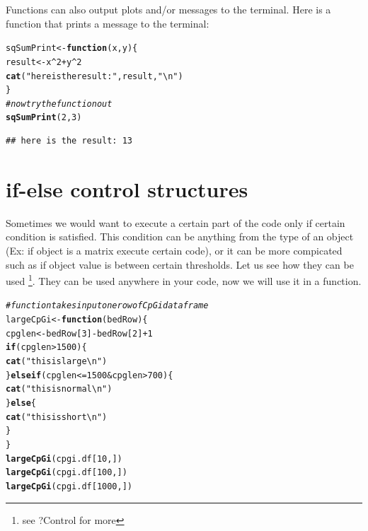 \documentclass[english,nohyper]{tufte-book}\usepackage[]{graphicx}\usepackage[]{color}
\makeatletter
\newcommand{\hlnum}[1]{\textcolor[rgb]{0.686,0.059,0.569}{#1}}%
\newcommand{\hlstr}[1]{\textcolor[rgb]{0.192,0.494,0.8}{#1}}%
\newcommand{\hlcom}[1]{\textcolor[rgb]{0.678,0.584,0.686}{\textit{#1}}}%
\newcommand{\hlopt}[1]{\textcolor[rgb]{0,0,0}{#1}}%
\newcommand{\hlstd}[1]{\textcolor[rgb]{0.345,0.345,0.345}{#1}}%
\newcommand{\hlkwa}[1]{\textcolor[rgb]{0.161,0.373,0.58}{\textbf{#1}}}%
\newcommand{\hlkwb}[1]{\textcolor[rgb]{0.69,0.353,0.396}{#1}}%
\newcommand{\hlkwc}[1]{\textcolor[rgb]{0.333,0.667,0.333}{#1}}%
\newcommand{\hlkwd}[1]{\textcolor[rgb]{0.737,0.353,0.396}{\textbf{#1}}}%
\newenvironment{kframe}{%
 \def\at@end@of@kframe{}%
 \ifinner\ifhmode%
  \def\at@end@of@kframe{\end{minipage}}%
  \begin{minipage}{\columnwidth}%
 \fi\fi%
 \def\FrameCommand##1{\hskip\@totalleftmargin \hskip-\fboxsep
 \colorbox{shadecolor}{##1}\hskip-\fboxsep
     \hskip-\linewidth \hskip-\@totalleftmargin \hskip\columnwidth}%
 \MakeFramed {\advance\hsize-\width
   \@totalleftmargin\z@ \linewidth\hsize
   \@setminipage}}%
 {\par\unskip\endMakeFramed%
 \at@end@of@kframe}
\newenvironment{knitrout}{}{} %
\makeatother
\begin{document}
Functions can also output plots and/or messages to the terminal. Here
is a function that prints a message to the terminal:

\begin{knitrout}
\color{fgcolor}\begin{kframe}
\begin{alltt}
\hlstd{sqSumPrint} \hlkwb{<-} \hlkwa{function}\hlstd{(}\hlkwc{x}\hlstd{,} \hlkwc{y}\hlstd{) \{}
    \hlstd{result} \hlkwb{<-} \hlstd{x}\hlopt{^}\hlnum{2} \hlopt{+} \hlstd{y}\hlopt{^}\hlnum{2}
    \hlkwd{cat}\hlstd{(}\hlstr{"here is the result:"}\hlstd{, result,} \hlstr{"\textbackslash{}n"}\hlstd{)}
\hlstd{\}}
\hlcom{# now try the function out}
\hlkwd{sqSumPrint}\hlstd{(}\hlnum{2}\hlstd{,} \hlnum{3}\hlstd{)}
\end{alltt}
\begin{verbatim}
## here is the result: 13
\end{verbatim}
\end{kframe}
\end{knitrout}



\section{if-else control structures}

Sometimes we would want to execute a certain part of the code only
if certain condition is satisfied. This condition can be anything
from the type of an object (Ex: if object is a matrix execute certain
code), or it can be more compicated such as if object value is between
certain thresholds. Let us see how they can be used%
\footnote{see ?Control for more%
}. They can be used anywhere in your code, now we will use it in a
function.

\begin{knitrout}
\color{fgcolor}\begin{kframe}
\begin{alltt}
\hlcom{# function takes input one row of CpGi data frame}
\hlstd{largeCpGi} \hlkwb{<-} \hlkwa{function}\hlstd{(}\hlkwc{bedRow}\hlstd{) \{}
    \hlstd{cpglen} \hlkwb{<-} \hlstd{bedRow[}\hlnum{3}\hlstd{]} \hlopt{-} \hlstd{bedRow[}\hlnum{2}\hlstd{]} \hlopt{+} \hlnum{1}
    \hlkwa{if} \hlstd{(cpglen} \hlopt{>} \hlnum{1500}\hlstd{) \{}
        \hlkwd{cat}\hlstd{(}\hlstr{"this is large\textbackslash{}n"}\hlstd{)}
    \hlstd{\}} \hlkwa{else if} \hlstd{(cpglen} \hlopt{<=} \hlnum{1500} \hlopt{&} \hlstd{cpglen} \hlopt{>} \hlnum{700}\hlstd{) \{}
        \hlkwd{cat}\hlstd{(}\hlstr{"this is normal\textbackslash{}n"}\hlstd{)}
    \hlstd{\}} \hlkwa{else} \hlstd{\{}
        \hlkwd{cat}\hlstd{(}\hlstr{"this is short\textbackslash{}n"}\hlstd{)}
    \hlstd{\}}
\hlstd{\}}
\hlkwd{largeCpGi}\hlstd{(cpgi.df[}\hlnum{10}\hlstd{, ])}
\hlkwd{largeCpGi}\hlstd{(cpgi.df[}\hlnum{100}\hlstd{, ])}
\hlkwd{largeCpGi}\hlstd{(cpgi.df[}\hlnum{1000}\hlstd{, ])}
\end{alltt}
\end{kframe}
\end{knitrout}
\end{document}
